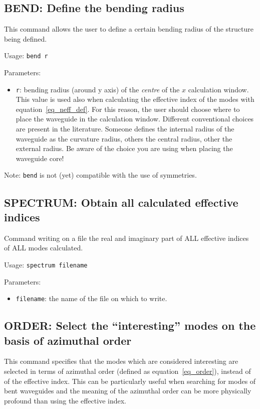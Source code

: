 \subsection{BEND: Define the bending radius}
\label{subsec_bend}
This command allows the user to define a certain bending radius of the structure being defined.
    
    Usage:  \lstinline!bend r!
    
    Parameters:
    \begin{itemize}
    \item
    \lstinline!r!: bending radius (around y axis) of the \textsl{centre} of the 
    $x$ calculation window.
    This value is used also when calculating the effective index of the modes with equation~\eqref{eq_neff_def}.
    For this reason, the user should choose where to place the waveguide 
    in the calculation window. Different conventional choices are present in the literature. Someone defines the internal radius of the waveguide as
    the curvature radius, others the central radius, other the external radius.
    Be aware of the choice you are using when placing the waveguide core!
    \end{itemize}
    
    Note:  \lstinline!bend! is not (yet) compatible with the use of symmetries.
    
\subsection{SPECTRUM: Obtain all calculated effective indices} 
\label{subsec_spectrum}
   Command writing on a file the real and imaginary part of ALL effective 
        indices of ALL modes calculated.

    Usage: \lstinline!spectrum filename!
    
    Parameters:
    \begin{itemize}
    \item \lstinline!filename!: the name of the file on which to write.
    \end{itemize}
    

    
\subsection{ORDER: Select the  ``interesting'' modes on the basis of azimuthal order}
\label{subsec_order}
    This command specifies that the modes which are considered interesting are selected in terms of
    azimuthal order (defined as equation~\eqref{eq_order}), instead of of the effective index. This can be particularly
    useful when searching for modes of bent waveguides and the meaning of the azimuthal order can be more physically profound than using the effective index.
    
